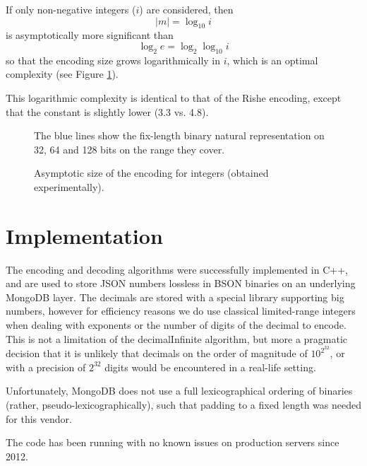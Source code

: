\documentclass{acm_proc_article-sp}
\begin{document}
If only non-negative integers ($i$) are considered, then $$|m|= \log_{10} i$$ is asymptotically more significant than $$\log_2 e=\log_2\log_{10} i$$ so that the encoding size grows logarithmically in $i$, which is an optimal complexity (see Figure \ref{figure-size}).

This logarithmic complexity is identical to that of the Rishe encoding, except that the constant is slightly lower (3.3 vs. 4.8).


\begin{figure}
\label{figure-size}
\caption{Asymptotic size of the encoding for integers (obtained experimentally).}
The blue lines show the fix-length binary natural representation on 32, 64 and 128 bits on the range they cover.

\end{figure}

\section{Implementation}
\label{section-implementation}
The encoding and decoding algorithms were successfully implemented in C++, and are used to store JSON numbers lossless in BSON binaries on an underlying MongoDB layer. The decimals are stored with a special library supporting big numbers, however for efficiency reasons we do use classical limited-range integers when dealing with exponents or the number of digits of the decimal to encode. This is not a limitation of the decimalInfinite algorithm, but more a pragmatic decision that it is unlikely that decimals on the order of magnitude of $10^{2^{32}}$, or with a precision of $2^{32}$ digits would be encountered in a real-life setting.

Unfortunately, MongoDB does not use a full lexicographical ordering of binaries (rather, pseudo-lexicographically), such that padding to a fixed length was needed for this vendor.

The code has been running with no known issues on production servers since 2012.
\end{document}
